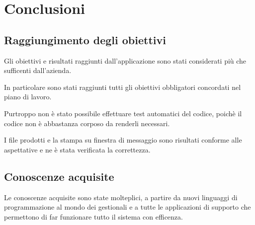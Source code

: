 
\chapter{Conclusioni}
\label{cap:conclusioni}
\section{Raggiungimento degli obiettivi}
Gli obiettivi e risultati raggiunti dall'applicazione sono stati considerati più che sufficenti dall'azienda.

In particolare sono stati raggiunti tutti gli obiettivi obbligatori concordati nel piano di lavoro.

Purtroppo non è stato possibile effettuare test automatici del codice, poichè il codice non è abbastanza corposo da renderli necessari.

I file prodotti e la stampa su finestra di messaggio sono risultati conforme alle aspettative e ne è stata verificata la correttezza.

\section{Conoscenze acquisite}
Le conoscenze acquisite sono state molteplici, a partire da nuovi linguaggi di programmazione al mondo dei gestionali e a tutte le applicazioni di supporto che permettono di far funzionare tutto il sistema con efficenza.

